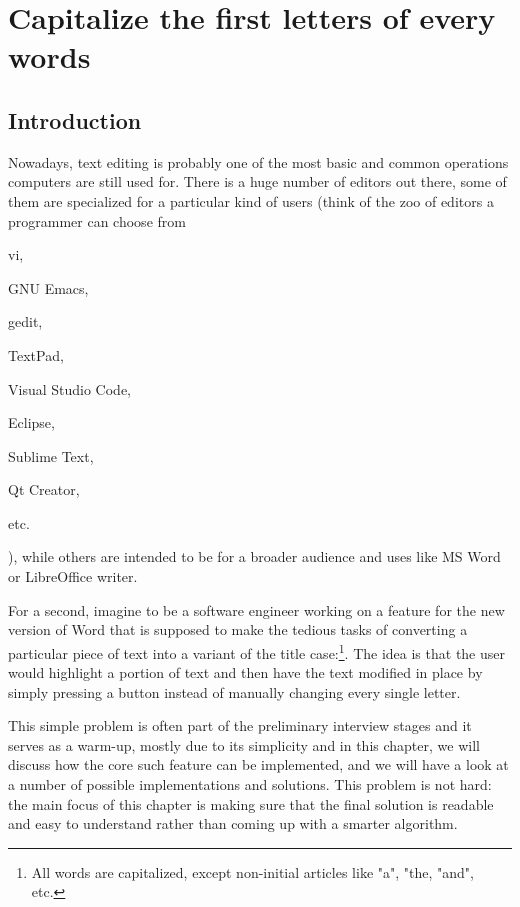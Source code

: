 %

\chapter{Capitalize the first letters of every words}
\label{ch:capitalize_words_first_letter}
\section*{Introduction}
Nowadays, text editing is probably one of the most basic and common operations computers are still used for. There is a huge number of editors out there, some of them are specialized for a particular kind of users (think of the zoo of editors a programmer can choose from\begin{enumerate*}
	\item vi,
	\item GNU Emacs,
	\item gedit,
	\item TextPad,
	\item Visual Studio Code,
	\item Eclipse,
	\item Sublime Text,
	\item Qt Creator,
	\item etc.
\end{enumerate*}
), while others are intended to be for a broader audience and uses like MS Word or LibreOffice writer. 


For a second, imagine to be a software engineer working on a feature for the new version of Word that is supposed to make the tedious tasks of converting a particular piece of text into a variant of the title case:\footnote{All words are capitalized, except non-initial articles like "a", "the, "and", etc.}.
The idea is that the user would highlight a portion of text and then have the text modified in place by simply pressing a button instead of manually changing every single letter. 


This simple problem is often part of the preliminary interview stages and it serves as a warm-up, mostly due to its simplicity and in this chapter, we will discuss how the core such feature can be implemented, and we will have a look at a number of possible implementations and solutions. 
This problem is not hard: the main focus of this chapter is making sure that the final solution is readable and easy to understand rather than coming up with a smarter algorithm.

